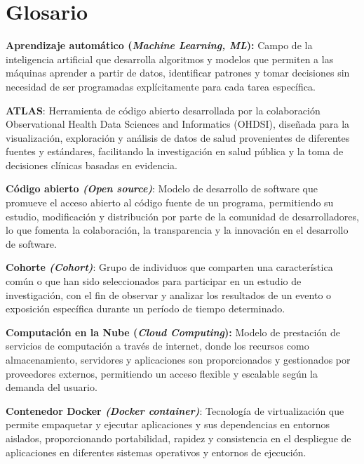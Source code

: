 \chapter{Glosario}\label{anexo:glosario}


\textbf{Aprendizaje automático (\textit{Machine Learning, ML}):} Campo de la inteligencia artificial que desarrolla algoritmos y modelos que permiten a las máquinas aprender a partir de datos, identificar patrones y tomar decisiones sin necesidad de ser programadas explícitamente para cada tarea específica.

\textbf{ATLAS}: Herramienta de código abierto desarrollada por la colaboración Observational Health Data Sciences and Informatics (OHDSI), diseñada para la visualización, exploración y análisis de datos de salud provenientes de diferentes fuentes y estándares, facilitando la investigación en salud pública y la toma de decisiones clínicas basadas en evidencia.





\textbf{Código abierto \textit{(Open source)}}: Modelo de desarrollo de software que promueve el acceso abierto al código fuente de un programa, permitiendo su estudio, modificación y distribución por parte de la comunidad de desarrolladores, lo que fomenta la colaboración, la transparencia y la innovación en el desarrollo de software.

\textbf{Cohorte \textit{(Cohort)}}: Grupo de individuos que comparten una característica común o que han sido seleccionados para participar en un estudio de investigación, con el fin de observar y analizar los resultados de un evento o exposición específica durante un período de tiempo determinado.

\textbf{Computación en la Nube (\textit{Cloud Computing}):} Modelo de prestación de servicios de computación a través de internet, donde los recursos como almacenamiento, servidores y aplicaciones son proporcionados y gestionados por proveedores externos, permitiendo un acceso flexible y escalable según la demanda del usuario.

\textbf{Contenedor Docker \textit{(Docker container)}}: Tecnología de virtualización que permite empaquetar y ejecutar aplicaciones y sus dependencias en entornos aislados, proporcionando portabilidad, rapidez y consistencia en el despliegue de aplicaciones en diferentes sistemas operativos y entornos de ejecución.



